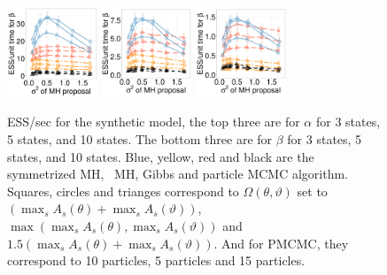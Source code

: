 \begin{figure}[H]
  \begin{minipage}[h!]{0.99\linewidth}
    \includegraphics [width=0.24\textwidth, angle=0]{figs/new_whole_exp_figs/exp_beta_dim3.pdf}
	\hspace{.6in}
    \includegraphics [width=0.24\textwidth, angle=0]{figs/new_whole_exp_figs/exp_beta_dim5.pdf}
	\hspace{.6in}
    \includegraphics [width=0.24\textwidth, angle=0]{figs/new_whole_exp_figs/exp_beta_dim10.pdf}
  \end{minipage}
    \caption{ESS/sec for the synthetic model, the top three are for $\alpha$ for 3 states, 5 states, and 10 states. The bottom three are for $\beta$ for 3 states, 5 states, and 10 states. Blue, yellow, red and black are the symmetrized MH, \naive\ MH, Gibbs and particle MCMC algorithm.  Squares, circles and trianges correspond to $\Omega(\theta,\vartheta)$ set to $(\max_s A_s(\theta) + \max_s A_s(\vartheta))$, $\max(\max_s A_s(\theta), \max_s A_s(\vartheta))$ and  $1.5(\max_s A_s(\theta) + \max_s A_s(\vartheta))$. And for PMCMC, they correspond to 10 particles, 5 particles and 15 particles.}
     \label{fig:ESS_EXP}
  \end{figure}



